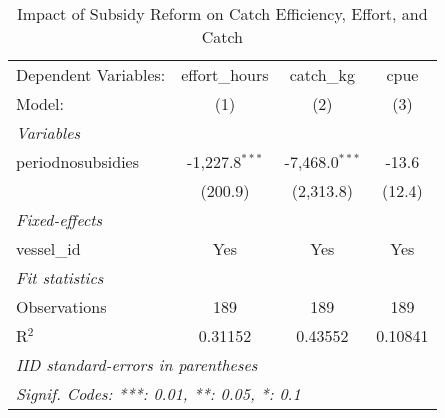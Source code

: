 
\begin{table}[htbp]
   \caption{\label{tab:cpue_regression} Impact of Subsidy Reform on Catch Efficiency, Effort, and Catch}
   \centering
   \begin{tabular}{lccc}
      \tabularnewline \midrule \midrule
      Dependent Variables: & effort\_hours    & catch\_kg        & cpue\\  
      Model:               & (1)              & (2)              & (3)\\  
      \midrule
      \emph{Variables}\\
      periodnosubsidies    & -1,227.8$^{***}$ & -7,468.0$^{***}$ & -13.6\\   
                           & (200.9)          & (2,313.8)        & (12.4)\\   
      \midrule
      \emph{Fixed-effects}\\
      vessel\_id           & Yes              & Yes              & Yes\\  
      \midrule
      \emph{Fit statistics}\\
      Observations         & 189              & 189              & 189\\  
      R$^2$                & 0.31152          & 0.43552          & 0.10841\\  
      \midrule \midrule
      \multicolumn{4}{l}{\emph{IID standard-errors in parentheses}}\\
      \multicolumn{4}{l}{\emph{Signif. Codes: ***: 0.01, **: 0.05, *: 0.1}}\\
   \end{tabular}
\end{table}


